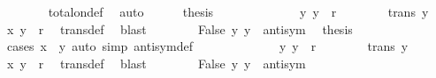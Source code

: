 \begin{isabellebody}
\ \ \ \ \ \ \isamarkupfalse%
\ total{\isacharunderscore}{\kern0pt}on{\isacharunderscore}{\kern0pt}def\ \isamarkupfalse%
\ auto\isanewline
\ \ \ \ \isamarkupfalse%
\ {\isacharquery}{\kern0pt}thesis\isanewline
\ \ \ \ \isamarkupfalse%
\isanewline
\ \ \ \ \ \ \isamarkupfalse%
\ {\isacharasterisk}{\kern0pt}{\isacharcolon}{\kern0pt}\ {\isachardoublequoteopen}{\isacharparenleft}{\kern0pt}y{}{\isacharcomma}{\kern0pt}\ y{}{\isacharparenright}{\kern0pt}\ {\isasymin}\ r{\isachardoublequoteclose}\isanewline
\ \ \ \ \ \ \isamarkupfalse%
\ trans\ y{}{\isacharparenleft}{\kern0pt}{}{\isacharparenright}{\kern0pt}\ \isamarkupfalse%
\ {\isachardoublequoteopen}{\isacharparenleft}{\kern0pt}x{}{\isacharcomma}{\kern0pt}\ y{}{\isacharparenright}{\kern0pt}\ {\isasymin}\ r{\isachardoublequoteclose}\ \isamarkupfalse%
\ trans{\isacharunderscore}{\kern0pt}def\ \isamarkupfalse%
\ blast\isanewline
\ \ \ \ \ \ \isamarkupfalse%
\ False\ y{}\ y{}\ {\isacharasterisk}{\kern0pt}\ antisym\ \isamarkupfalse%
\ {\isacharquery}{\kern0pt}thesis\ \isamarkupfalse%
\ {\isacharparenleft}{\kern0pt}cases\ {\isachardoublequoteopen}x{}\ {\isacharequal}{\kern0pt}\ y{}{\isachardoublequoteclose}{\isacharparenright}{\kern0pt}\ {\isacharparenleft}{\kern0pt}auto\ simp{\isacharcolon}{\kern0pt}\ antisym{\isacharunderscore}{\kern0pt}def{\isacharparenright}{\kern0pt}\isanewline
\ \ \ \ \isamarkupfalse%
\isanewline
\ \ \ \ \ \ \isamarkupfalse%
\ {\isacharasterisk}{\kern0pt}{\isacharcolon}{\kern0pt}\ {\isachardoublequoteopen}{\isacharparenleft}{\kern0pt}y{}{\isacharcomma}{\kern0pt}\ y{}{\isacharparenright}{\kern0pt}\ {\isasymin}\ r{\isachardoublequoteclose}\isanewline
\ \ \ \ \ \ \isamarkupfalse%
\ trans\ y{}{\isacharparenleft}{\kern0pt}{}{\isacharparenright}{\kern0pt}\ \isamarkupfalse%
\ {\isachardoublequoteopen}{\isacharparenleft}{\kern0pt}x{}{\isacharcomma}{\kern0pt}\ y{}{\isacharparenright}{\kern0pt}\ {\isasymin}\ r{\isachardoublequoteclose}\ \isamarkupfalse%
\ trans{\isacharunderscore}{\kern0pt}def\ \isamarkupfalse%
\ blast\isanewline
\ \ \ \ \ \ \isamarkupfalse%
\ False\ y{}\ y{}\ {\isacharasterisk}{\kern0pt}\ antisym\ \isamarkupfalse%

\end{isabellebody}
